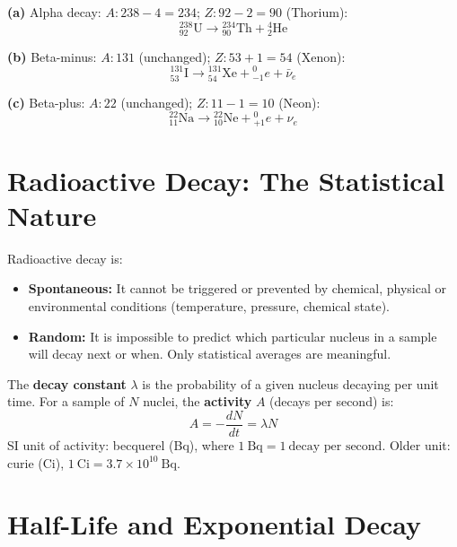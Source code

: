 \begin{solutionbox}
\textbf{(a)} Alpha decay: $A: 238-4=234$;
$Z: 92-2=90$ (Thorium):
\[
  {}^{238}_{92}\text{U} \rightarrow
  {}^{234}_{90}\text{Th} + {}^{4}_{2}\text{He}
\]

\textbf{(b)} Beta-minus: $A: 131$ (unchanged);
$Z: 53+1=54$ (Xenon):
\[
  {}^{131}_{53}\text{I} \rightarrow
  {}^{131}_{54}\text{Xe} + {}^{0}_{-1}e
  + \bar{\nu}_e
\]

\textbf{(c)} Beta-plus: $A: 22$ (unchanged);
$Z: 11-1=10$ (Neon):
\[
  {}^{22}_{11}\text{Na} \rightarrow
  {}^{22}_{10}\text{Ne} + {}^{0}_{+1}e + \nu_e
\]
\end{solutionbox}

\section{Radioactive Decay: The Statistical Nature}

\begin{defbox}
Radioactive decay is:
\begin{itemize}[noitemsep]
  \item \textbf{Spontaneous:} It cannot be triggered
  or prevented by chemical, physical or environmental
  conditions (temperature, pressure, chemical state).
  \item \textbf{Random:} It is impossible to predict
  which particular nucleus in a sample will decay next
  or when. Only statistical averages are meaningful.
\end{itemize}

The \textbf{decay constant} $\lambda$ is the
probability of a given nucleus decaying per unit time.
For a sample of $N$ nuclei, the \textbf{activity}
$A$ (decays per second) is:
\[
  A = -\frac{dN}{dt} = \lambda N
\]
SI unit of activity: becquerel (Bq),
where $1\ \text{Bq} = 1\ \text{decay per second}$.
Older unit: curie (Ci), $1\ \text{Ci}
= 3.7\times10^{10}\ \text{Bq}$.
\end{defbox}

\section{Half-Life and Exponential Decay}


